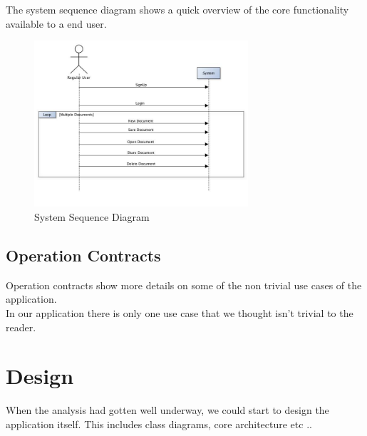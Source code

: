 \documentclass[11pt]{article}
\begin{document}
   The system sequence diagram shows a quick overview of the core functionality available to a end user.
\begin{figure}[H]
  		\centering
    	\includegraphics[width=300px]{images/Complete_SSQ.jpg}
    	\caption{System Sequence Diagram}
\end{figure}
\subsection{Operation Contracts}
\label{sec-2-6}
Operation contracts show more details on some of the non trivial use cases of the application. \\
In our application there is only one use case that we thought isn't trivial to the reader. \\

\section{Design}
\label{sec-3}
When the analysis had gotten well underway, we could start to design the application itself. This includes class diagrams, core architecture etc ..
\end{document}
